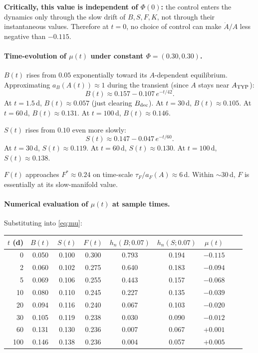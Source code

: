 \documentclass[11pt,a4paper]{article}
\theoremstyle{definition}
\begin{document}
\textbf{Critically, this value is independent of $\Phi(0)$:} the control enters the dynamics only through the slow drift of $B, S, F, K$, not through their instantaneous values. Therefore at $t=0$, no choice of control can make $\dot A / A$ less negative than $-0.115$.

\paragraph{Time-evolution of $\mu(t)$ under constant $\Phi = (0.30, 0.30)$.}
$B(t)$ rises from $0.05$ exponentially toward its $A$-dependent equilibrium. Approximating $a_B(A(t)) \approx 1$ during the transient (since $A$ stays near $A_{\rm TYP}$):
\[
B(t) \approx 0.157 - 0.107\,e^{-t/42}.
\]
At $t = 1.5$\,d, $B(t) \approx 0.057$ (just clearing $B_{\rm dec}$). At $t = 30$\,d, $B(t) \approx 0.105$. At $t = 60$\,d, $B(t) \approx 0.131$. At $t = 100$\,d, $B(t) \approx 0.146$.

$S(t)$ rises from $0.10$ even more slowly:
\[
S(t) \approx 0.147 - 0.047\,e^{-t/60}.
\]
At $t = 30$\,d, $S(t) \approx 0.119$. At $t = 60$\,d, $S(t) \approx 0.130$. At $t = 100$\,d, $S(t) \approx 0.138$.

$F(t)$ approaches $F^* \approx 0.24$ on time-scale $\tau_F / a_F(A) \approx 6$\,d. Within $\sim 30$\,d, $F$ is essentially at its slow-manifold value.

\paragraph{Numerical evaluation of $\mu(t)$ at sample times.} Substituting into \eqref{eq:mu}:

\begin{center}\small
\begin{tabular}{rcccccccc}
\toprule
$t$ (d) & $B(t)$ & $S(t)$ & $F(t)$ & $h_n(B; 0.07)$ & $h_n(S; 0.07)$ & $\mu(t)$ \\
\midrule
0   & 0.050 & 0.100 & 0.300 & 0.793 & 0.194 & $-0.115$ \\
2   & 0.060 & 0.102 & 0.275 & 0.640 & 0.183 & $-0.094$ \\
5   & 0.069 & 0.106 & 0.255 & 0.443 & 0.157 & $-0.068$ \\
10  & 0.080 & 0.110 & 0.245 & 0.227 & 0.135 & $-0.039$ \\
20  & 0.094 & 0.116 & 0.240 & 0.067 & 0.103 & $-0.020$ \\
30  & 0.105 & 0.119 & 0.238 & 0.030 & 0.090 & $-0.012$ \\
60  & 0.131 & 0.130 & 0.236 & 0.007 & 0.067 & $+0.001$ \\
100 & 0.146 & 0.138 & 0.236 & 0.004 & 0.057 & $+0.005$ \\
\bottomrule
\end{tabular}
\end{center}
\end{document}
